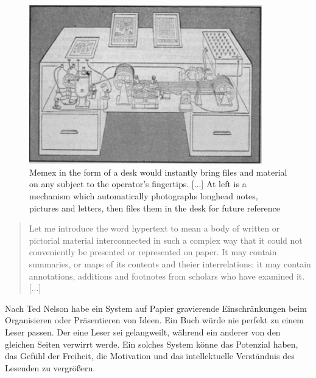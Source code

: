 \begin{figure}[!ht]
	\centering
	\includegraphics[width=0.9\textwidth]{image/memex}
	\caption{\glqq Memex in the form of a desk would instantly bring files and material on any subject to the operator's fingertips. [...] At left is a mechanism which automatically photographs longhead notes, pictures and letters, then files them in the desk for future reference\grqq{ } \cite[S.123]{Life1945}}
	\label{fig:memex}
\end{figure}

\begin{quote}
	\glqq Let me introduce the word hypertext to mean a body of written or pictorial material interconnected in such a complex way that it could not conveniently be presented or represented on paper. It may contain summaries, or maps of its contents and theier interrelations; it may contain annotations, additions and footnotes from scholars who have examined it. [...]\grqq{ }\cite{Nelson1965}
\end{quote}

Nach Ted Nelson habe ein System auf Papier gravierende Einschränkungen beim Organisieren oder Präsentieren von Ideen. Ein Buch würde nie perfekt zu einem Leser passen. Der eine Leser sei gelangweilt, während ein anderer von den gleichen Seiten verwirrt werde. \glqq Ein solches System könne das Potenzial haben, das Gefühl der Freiheit, die Motivation und das intellektuelle Verständnis des Lesenden zu vergrößern\grqq{ }\cite{Nelson1965}. 

